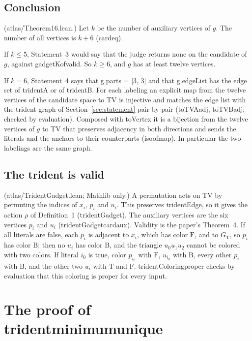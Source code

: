 \documentclass[11pt,a4paper]{article}
\newcommand{\leanus}{\textunderscore\allowbreak}
\newcommand{\lean}[1]{{\ttfamily\let\_\leanus #1}}
\newcommand{\GT}{G_{\mathrm{T}}}
\newcommand{\T}{\mathrm{T}}
\newcommand{\F}{\mathrm{F}}
\newcommand{\B}{\mathrm{B}}
\theoremstyle{definition}
\begin{document}
\subsection{Conclusion}\label{sec:conclusion}
(\lean{atlas/Theorem16.lean}.) Let $k$ be the number of auxiliary vertices
of $g$. The number of all vertices is $k+6$ (\lean{card\_eq}).

If $k\le5$, Statement~3 would say that the judge returns \lean{none} on the
candidate of $g$, against \lean{gadgetK\_of\_valid}. So $k\ge6$, and $g$ has
at least twelve vertices.

If $k=6$, Statement~4 says that
\lean{g.parts = [3, 3]} and that \lean{g.edgeList} has the edge set of
\lean{tridentA} or of \lean{tridentB}. For each labeling an explicit map from
the twelve vertices of the candidate space to \lean{TV} is injective and
matches the edge list with the trident graph of Section~\ref{sec:statement}
pair by pair (\lean{toTVA\_adj}, \lean{toTVB\_adj}; checked by evaluation).
Composed with \lean{toVertex} it is a bijection from the twelve vertices of
$g$ to \lean{TV} that preserves adjacency in both directions and sends the literals
and the anchors to their counterparts (\lean{iso\_of\_map}). In particular
the two labelings are the same graph.

\subsection{The trident is valid}\label{sec:tridentvalid}
(\lean{atlas/TridentGadget.lean}; Mathlib only.) A permutation acts on
\lean{TV} by permuting the indices of $x_i$, $p_i$ and $u_i$. This preserves
\lean{tridentEdge}, so it gives the action $\rho$ of Definition~1
(\lean{tridentGadget}). The auxiliary vertices are the six vertices $p_i$
and $u_i$ (\lean{tridentGadget\_card\_aux}). Validity is the paper's
Theorem~4. If all literals
are false, each $p_i$ is adjacent to $x_i$, which has color $\F$, and to
$\GT$, so $p_i$ has color $\B$; then no $u_i$ has color $\B$, and the
triangle $u_0u_1u_2$ cannot be colored with two colors. If literal $i_0$ is
true, color $p_{i_0}$ with $\F$, $u_{i_0}$ with $\B$, every other $p_i$ with
$\B$, and the other two $u_i$ with $\T$ and $\F$.
\lean{tridentColoring\_proper} checks by evaluation that this coloring is
proper for every input.

\section{The proof of \lean{trident\_minimum\_unique}}\label{sec:proof}
\end{document}
